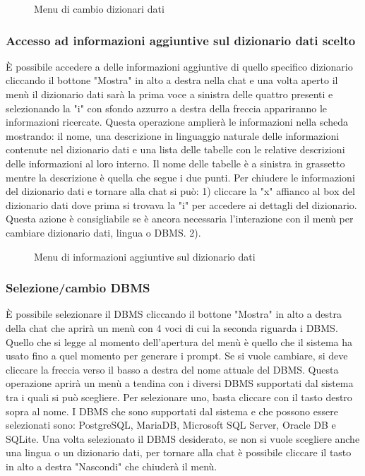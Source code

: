 \begin{figure}[H]
  \centering
  \caption{Menu di cambio dizionari dati}
\end{figure}

\subsubsection{Accesso ad informazioni aggiuntive sul dizionario dati scelto}

È possibile accedere a delle informazioni aggiuntive di quello specifico dizionario cliccando il bottone "Mostra" in alto a destra nella chat e una volta aperto il menù il dizionario dati sarà la prima voce a sinistra delle quattro presenti e selezionando la "i" con sfondo azzurro a destra della freccia appariranno le informazioni ricercate. Questa operazione amplierà le informazioni nella scheda mostrando: il nome, una descrizione in linguaggio naturale delle informazioni contenute nel dizionario dati e una lista delle tabelle con le relative descrizioni delle informazioni al loro interno. Il nome delle tabelle è a sinistra in grassetto mentre la descrizione è quella che segue i due punti. Per chiudere le informazioni del dizionario dati e tornare alla chat si può: 1) cliccare la "x" affianco al box del dizionario dati dove prima si trovava la "i" per accedere ai dettagli del dizionario. Questa azione è consigliabile se è ancora necessaria l'interazione con il menù per cambiare dizionario dati, lingua o DBMS. 2).

\begin{figure}[H]
  \centering
  \caption{Menu di informazioni aggiuntive sul dizionario dati}
\end{figure}

\subsubsection{Selezione/cambio DBMS}

È possibile selezionare il DBMS cliccando il bottone "Mostra" in alto a destra della chat che aprirà un menù con 4 voci di cui la seconda riguarda i DBMS. Quello che si legge al momento dell'apertura del menù è quello che il sistema ha usato fino a quel momento per generare i prompt. Se si vuole cambiare, si deve cliccare la freccia verso il basso a destra del nome attuale del DBMS. Questa operazione aprirà un menù a tendina con i diversi DBMS supportati dal sistema tra i quali si può scegliere. Per selezionare uno, basta cliccare con il tasto destro sopra al nome. I DBMS che sono supportati dal sistema e che possono essere selezionati sono: PostgreSQL, MariaDB, Microsoft SQL Server, Oracle DB e SQLite. Una volta selezionato il DBMS desiderato, se non si vuole scegliere anche una lingua o un dizionario dati, per tornare alla chat è possibile cliccare il tasto in alto a destra "Nascondi" che chiuderà il menù.

